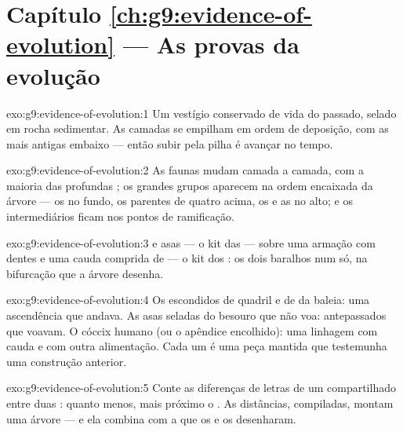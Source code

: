 \section*{Capítulo \ref{ch:g9:evidence-of-evolution} --- As provas da evolução}

\begin{solution}{exo:g9:evidence-of-evolution:1}
Um vestígio conservado de vida do passado, selado em rocha
sedimentar. As camadas se empilham em ordem de deposição, com
as mais antigas embaixo --- então subir pela pilha é avançar
no tempo.
\end{solution}

\begin{solution}{exo:g9:evidence-of-evolution:2}
As faunas mudam camada a camada, com a maioria das 
profundas ; os grandes grupos aparecem na ordem
encaixada da árvore --- os  no fundo, os parentes de
quatro  acima, os  e as  no alto; e os
intermediários ficam nos pontos de ramificação.
\end{solution}

\begin{solution}{exo:g9:evidence-of-evolution:3}
 e asas --- o kit das  --- sobre uma armação com
dentes e uma cauda comprida de  --- o kit dos : os
dois baralhos num  só, na bifurcação que a árvore
desenha.
\end{solution}

\begin{solution}{exo:g9:evidence-of-evolution:4}
Os  escondidos de quadril e de  da baleia: uma
ascendência que andava. As asas seladas do besouro que não
voa: antepassados que voavam. O cóccix humano (ou o apêndice
encolhido): uma linhagem com cauda e com outra alimentação.
Cada um é uma peça mantida que testemunha uma construção
anterior.
\end{solution}

\begin{solution}{exo:g9:evidence-of-evolution:5}
Conte as diferenças de letras de um  compartilhado entre
duas : quanto menos, mais próximo o . As
distâncias, compiladas, montam uma árvore --- e ela combina
com a que os  e os  desenharam.
\end{solution}


